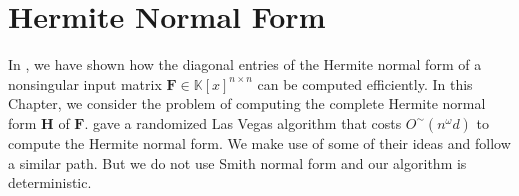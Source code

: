 
\chapter{\label{chap:hermite} Hermite Normal Form}

In , we have shown how the diagonal entries
of the Hermite normal form of a nonsingular input matrix $\mathbf{F}\in\mathbb{K}\left[x\right]^{n\times n}$
can be computed efficiently. In this Chapter, we consider the problem
of computing the complete Hermite normal form $\mathbf{H}$ of $\mathbf{F}$.
\citet{GS2011,G2011} gave a randomized Las Vegas algorithm that costs
$O^{\sim}\left(n^{\omega}d\right)$ to compute the Hermite normal
form. We make use of some of their ideas and follow a similar path.
But we do not use Smith normal form and our algorithm is deterministic.

